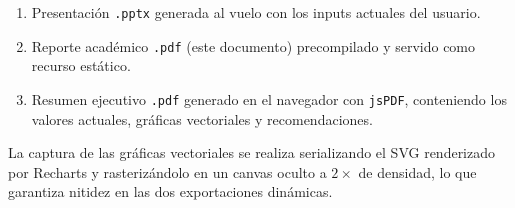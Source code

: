 \begin{enumerate}
  \item Presentación \texttt{.pptx} generada al vuelo con los inputs actuales del usuario.
  \item Reporte académico \texttt{.pdf} (este documento) precompilado y servido como recurso estático.
  \item Resumen ejecutivo \texttt{.pdf} generado en el navegador con \texttt{jsPDF}, conteniendo los valores actuales, gráficas vectoriales y recomendaciones.
\end{enumerate}

La captura de las gráficas vectoriales se realiza serializando el SVG renderizado por Recharts y rasterizándolo en un canvas oculto a $2\times$ de densidad, lo que garantiza nitidez en las dos exportaciones dinámicas.
